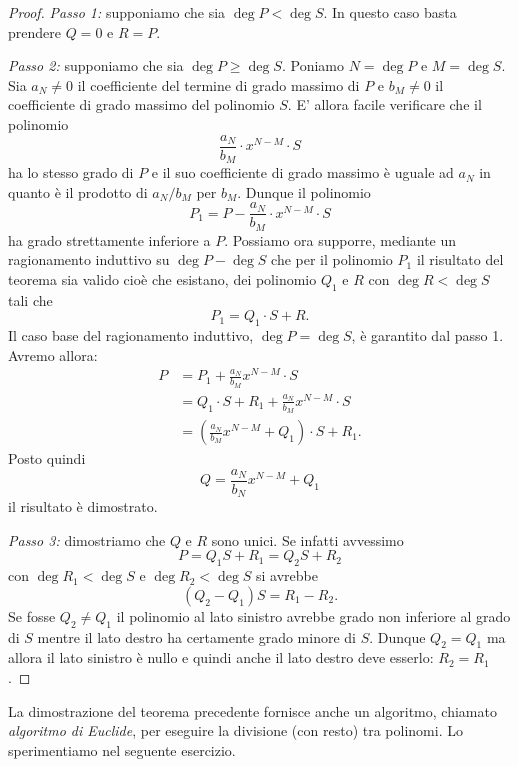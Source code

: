  \begin{proof}
  \emph{Passo 1:} supponiamo che sia $\deg P < \deg S$.
  In questo caso basta prendere $Q=0$ e $R=P$.
  
  \emph{Passo 2:} supponiamo che sia $\deg P \ge \deg S$.
  Poniamo $N=\deg P$ e $M=\deg S$.
  Sia $a_N\neq 0$ il coefficiente del termine di grado massimo
  di $P$ e $b_M\neq 0$ il coefficiente di grado massimo
  del polinomio $S$.
  E' allora facile verificare che il polinomio
  \[
  \frac{a_N}{b_M} \cdot x^{N-M}\cdot S
  \]
  ha lo stesso grado di $P$ e il suo coefficiente di grado
  massimo è uguale ad $a_N$ in quanto è il prodotto di
  $a_N/b_M$ per $b_M$.
  Dunque il polinomio
  \[
   P_1 = P - \frac{a_N}{b_M} \cdot x^{N-M}\cdot S
  \]
  ha grado strettamente inferiore a $P$.
  Possiamo ora supporre, mediante un ragionamento induttivo
  su $\deg P - \deg S$
  che per il polinomio $P_1$ il risultato del teorema sia
  valido cioè
  che esistano, dei polinomio $Q_1$ e $R$
  con $\deg R < \deg S$ tali che
  \[
    P_1 = Q_1 \cdot S + R.
  \]
  Il caso base del ragionamento induttivo,
  $\deg P = \deg S$, è garantito dal passo 1.
  Avremo allora:
  \begin{align*}
    P &= P_1 + \frac{a_N}{b_M} x^{N-M}\cdot S\\
      &= Q_1 \cdot S + R_1 + \frac{a_N}{b_M} x^{N-M}\cdot S\\
      &= (\frac{a_N}{b_M} x^{N-M} + Q_1) \cdot S + R_1.
  \end{align*}
  Posto quindi
  \[
   Q = \frac{a_N}{b_N} x^{N-M} + Q_1
  \]
  il risultato è dimostrato.
  
  \emph{Passo 3:} dimostriamo che $Q$ e $R$ sono unici. Se infatti avvessimo 
  \[
    P = Q_1 S + R_1 = Q_2 S + R_2   
  \]
  con $\deg R_1<\deg S$ e $\deg R_2 < \deg S$ si avrebbe 
  \[
  (Q_2 - Q_1) S = R_1 - R_2.    
  \]
  Se fosse $Q_2 \neq Q_1$ il polinomio al lato sinistro avrebbe grado non inferiore al grado di 
  $S$ mentre il lato destro ha certamente grado minore di $S$.
  Dunque $Q_2=Q_1$ ma allora il lato sinistro è nullo e quindi anche il lato destro deve 
  esserlo: $R_2=R_1$.
  \end{proof}
  
  La dimostrazione del teorema precedente fornisce anche un
  algoritmo, chiamato \emph{algoritmo di Euclide},
  per eseguire la divisione (con resto) tra polinomi.
  Lo sperimentiamo nel seguente esercizio.
  
